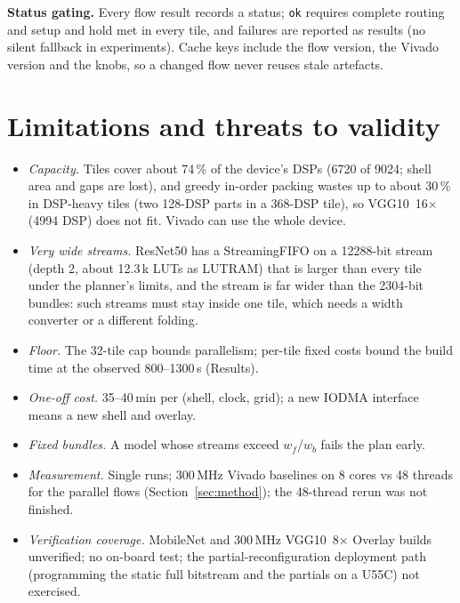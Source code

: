 \documentclass[10pt,twocolumn]{article}
\newcommand{\code}[1]{\texttt{\small #1}}
\begin{document}
\textbf{Status gating.} Every flow result records a status; \code{ok} requires complete routing
and setup and hold met in every tile, and failures are reported as results (no silent fallback in
experiments). Cache keys include the flow version, the Vivado version and the knobs, so a changed
flow never reuses stale artefacts.

\section{Limitations and threats to validity}
\label{sec:limits}
\begin{itemize}\setlength{\itemsep}{0pt}
\item \emph{Capacity.} Tiles cover about 74\,\% of the device's DSPs (6720 of 9024; shell area
and gaps are lost), and greedy in-order packing wastes up to about 30\,\% in DSP-heavy tiles (two
128-DSP parts in a 368-DSP tile), so VGG10~16$\times$ (4994 DSP) does not fit. Vivado can use the
whole device.
\item \emph{Very wide streams.} ResNet50 has a StreamingFIFO on a 12288-bit stream (depth 2,
about 12.3\,k LUTs as LUTRAM) that is larger than every tile under the planner's limits, and the
stream is far wider than the 2304-bit bundles: such streams must stay inside one tile, which
needs a width converter or a different folding.
\item \emph{Floor.} The 32-tile cap bounds parallelism; per-tile fixed costs bound the build
time at the observed 800--1300\,s (Results).
\item \emph{One-off cost.} 35--40\,min per (shell, clock, grid); a new IODMA interface means a
new shell and overlay.
\item \emph{Fixed bundles.} A model whose streams exceed $w_f$/$w_b$ fails the plan early.
\item \emph{Measurement.} Single runs; 300\,MHz Vivado baselines on 8 cores vs 48 threads for
the parallel flows (Section~\ref{sec:method}); the 48-thread rerun was not finished.
\item \emph{Verification coverage.} MobileNet and 300\,MHz VGG10~8$\times$ Overlay builds
unverified; no on-board test; the partial-reconfiguration deployment path (programming the
static full bitstream and the partials on a U55C) not exercised.
\end{itemize}
\end{document}
